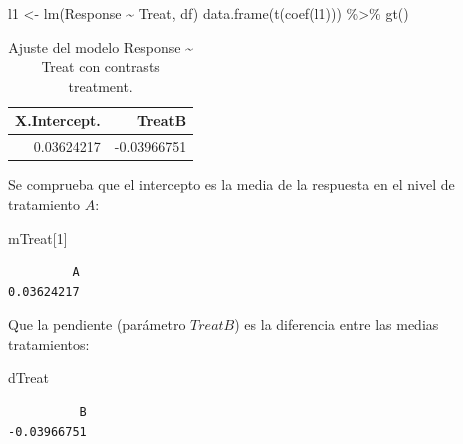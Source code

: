 \documentclass[
  12pt,
  a4paper,
  extrafontsizes,
  onecolumn,
  openright,
  table]{memoir}
\newenvironment{Shaded}{\begin{snugshade}}{\end{snugshade}}
\newcommand{\DecValTok}[1]{\textcolor[rgb]{0.68,0.00,0.00}{#1}}
\newcommand{\FunctionTok}[1]{\textcolor[rgb]{0.28,0.35,0.67}{#1}}
\newcommand{\NormalTok}[1]{\textcolor[rgb]{0.00,0.23,0.31}{#1}}
\newcommand{\OtherTok}[1]{\textcolor[rgb]{0.00,0.23,0.31}{#1}}
\newcommand{\SpecialCharTok}[1]{\textcolor[rgb]{0.37,0.37,0.37}{#1}}
\begin{document}
\scriptsize

\begin{Shaded}
\begin{Highlighting}[]
\NormalTok{l1 }\OtherTok{\textless{}{-}} \FunctionTok{lm}\NormalTok{(Response }\SpecialCharTok{\textasciitilde{}}\NormalTok{ Treat, df)}
\FunctionTok{data.frame}\NormalTok{(}\FunctionTok{t}\NormalTok{(}\FunctionTok{coef}\NormalTok{(l1))) }\SpecialCharTok{\%\textgreater{}\%} \FunctionTok{gt}\NormalTok{()}
\end{Highlighting}
\end{Shaded}

\hypertarget{tbl-l1}{}
\begin{longtable}{rr}
\caption{\label{tbl-l1}Ajuste del modelo Response \textasciitilde{} Treat con contrasts
treatment. }\tabularnewline

\toprule
X.Intercept. & TreatB \\ 
\midrule
0.03624217 & -0.03966751 \\ 
\bottomrule
\end{longtable}

\normalsize

Se comprueba que el intercepto es la media de la respuesta en el nivel
de tratamiento \(A\):

\scriptsize

\begin{Shaded}
\begin{Highlighting}[]
\NormalTok{mTreat[}\DecValTok{1}\NormalTok{]}
\end{Highlighting}
\end{Shaded}

\begin{verbatim}
         A 
0.03624217 
\end{verbatim}

\normalsize

Que la pendiente (parámetro \(TreatB\)) es la diferencia entre las
medias tratamientos:

\scriptsize

\begin{Shaded}
\begin{Highlighting}[]
\NormalTok{dTreat}
\end{Highlighting}
\end{Shaded}

\begin{verbatim}
          B 
-0.03966751 
\end{verbatim}

\normalsize
\end{document}
